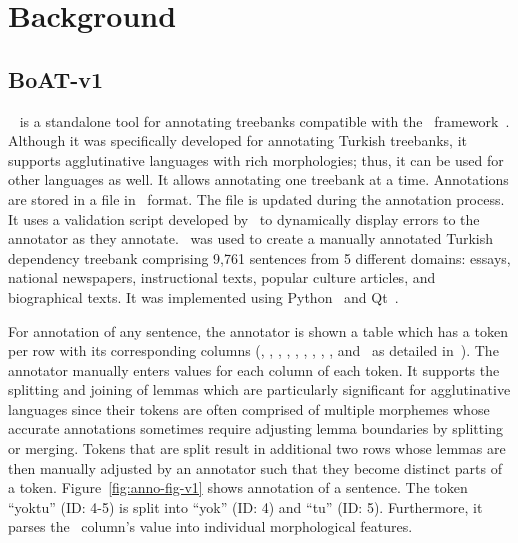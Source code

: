 \section{Background}
\label{sec:background}


\subsection{BoAT-v1}
\label{sec:boatvone}

\boatvone~\cite{anon} is a standalone tool for annotating treebanks compatible with the \ud\ framework~\cite{ud}.
Although it was specifically developed for annotating Turkish treebanks, it supports agglutinative languages with rich morphologies; thus, it can be used for other languages as well.
It allows annotating one treebank at a time.
Annotations are stored in a file in \conllu\ format.
The file is updated during the annotation process.
It uses a validation script developed by \ud\ to dynamically display errors to the annotator as they annotate.
\boatvone\ was used to create a manually annotated Turkish dependency treebank comprising 9,761 sentences from 5 different domains: essays, national newspapers, instructional texts, popular culture articles, and biographical texts.
It was implemented using Python~\cite{python} and Qt~\cite{qt}.

For annotation of any sentence, the annotator is shown a table which has a token per row with its corresponding columns (\id, \form, \udlemma, \upos, \xpos, \feats, \head, \deprel, \deps, and \misc\ as detailed in~\cite{anon}).
The annotator manually enters values for each column of each token.
It supports the splitting and joining of lemmas which are particularly significant for agglutinative languages since their tokens are often comprised of multiple morphemes whose accurate annotations sometimes require adjusting lemma boundaries by splitting or merging.
Tokens that are split result in additional two rows whose lemmas are then manually adjusted by an annotator such that they become distinct parts of a token.
Figure~\ref{fig:anno-fig-v1} shows annotation of a sentence.
The token ``yoktu'' (ID: 4-5) is split into ``yok'' (ID: 4) and ``tu'' (ID: 5). 
Furthermore, it parses the \feats\ column's value into individual morphological features.

